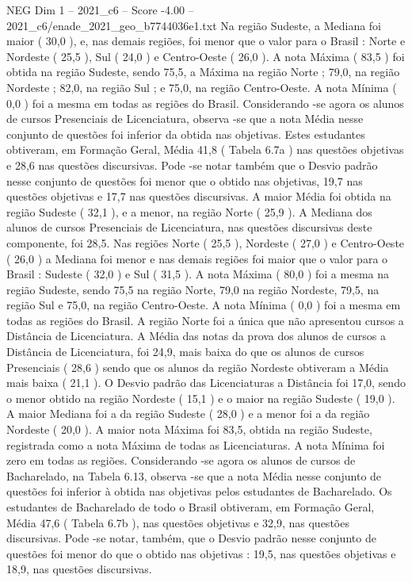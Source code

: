 \begin{textsample}{NEG Dim 1 – 2021\_c6 – Score -4.00 – 2021\_c6/enade\_2021\_geo\_b7744036e1.txt}
Na região Sudeste, a Mediana foi maior ( 30,0 ), e, nas demais regiões, foi menor que o valor para o Brasil : Norte e Nordeste ( 25,5 ), Sul ( 24,0 ) e Centro-Oeste ( 26,0 ).
A nota Máxima ( 83,5 ) foi obtida na região Sudeste, sendo 75,5, a Máxima na região Norte ; 79,0, na região Nordeste ; 82,0, na região Sul ; e 75,0, na região Centro-Oeste.
A nota Mínima ( 0,0 ) foi a mesma em todas as regiões do Brasil.
Considerando -se agora os alunos de cursos Presenciais de Licenciatura, observa -se que a nota Média nesse conjunto de questões foi inferior da obtida nas objetivas.
Estes estudantes obtiveram, em Formação Geral, Média 41,8 ( Tabela 6.7a ) nas questões objetivas e 28,6 nas questões discursivas.
Pode -se notar também que o Desvio padrão nesse conjunto de questões foi menor que o obtido nas objetivas, 19,7 nas questões objetivas e 17,7 nas questões discursivas.
A maior Média foi obtida na região Sudeste ( 32,1 ), e a menor, na região Norte ( 25,9 ).
A Mediana dos alunos de cursos Presenciais de Licenciatura, nas questões discursivas deste componente, foi 28,5.
Nas regiões Norte ( 25,5 ), Nordeste ( 27,0 ) e Centro-Oeste ( 26,0 ) a Mediana foi menor e nas demais regiões foi maior que o valor para o Brasil : Sudeste ( 32,0 ) e Sul ( 31,5 ).
A nota Máxima ( 80,0 ) foi a mesma na região Sudeste, sendo 75,5 na região Norte, 79,0 na região Nordeste, 79,5, na região Sul e 75,0, na região Centro-Oeste.
A nota Mínima ( 0,0 ) foi a mesma em todas as regiões do Brasil.
A região Norte foi a única que não apresentou cursos a Distância de Licenciatura.
A Média das notas da prova dos alunos de cursos a Distância de Licenciatura, foi 24,9, mais baixa do que os alunos de cursos Presenciais ( 28,6 ) sendo que os alunos da região Nordeste obtiveram a Média mais baixa ( 21,1 ).
O Desvio padrão das Licenciaturas a Distância foi 17,0, sendo o menor obtido na região Nordeste ( 15,1 ) e o maior na região Sudeste ( 19,0 ).
A maior Mediana foi a da região Sudeste ( 28,0 ) e a menor foi a da região Nordeste ( 20,0 ).
A maior nota Máxima foi 83,5, obtida na região Sudeste, registrada como a nota Máxima de todas as Licenciaturas.
A nota Mínima foi zero em todas as regiões.
Considerando -se agora os alunos de cursos de Bacharelado, na Tabela 6.13, observa -se que a nota Média nesse conjunto de questões foi inferior à obtida nas objetivas pelos estudantes de Bacharelado.
Os estudantes de Bacharelado de todo o Brasil obtiveram, em Formação Geral, Média 47,6 ( Tabela 6.7b ), nas questões objetivas e 32,9, nas questões discursivas.
Pode -se notar, também, que o Desvio padrão nesse conjunto de questões foi menor do que o obtido nas objetivas : 19,5, nas questões objetivas e 18,9, nas questões discursivas.

\end{textsample}

